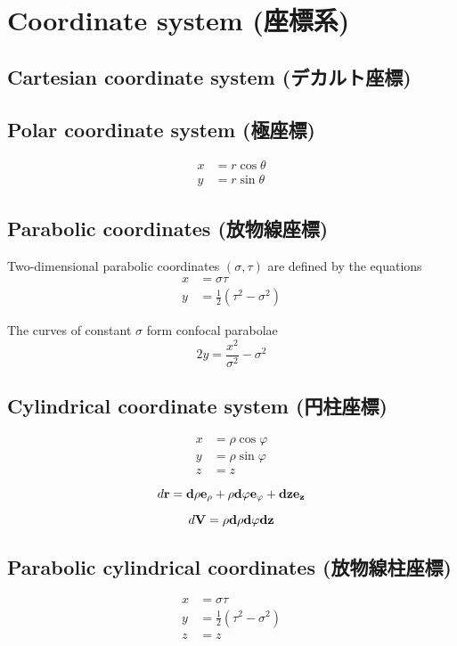 %
%
%
%
%
\section{Coordinate system (座標系)}


\subsection{Cartesian coordinate system (デカルト座標)}


\subsection{Polar coordinate system (極座標)}
\begin{align}
  x & = r\cos \theta \\
  y & = r\sin \theta
\end{align}


\subsection{Parabolic coordinates (放物線座標)}
Two-dimensional parabolic coordinates $ (\sigma ,\tau ) $ are defined by the equations
\begin{align}
  x & = \sigma \tau \\
  y & = \frac{1}{2} \left( \tau^{2} - \sigma^{2} \right)
\end{align}

The curves of constant $ \sigma  $ form confocal parabolae
\begin{equation}
  2y = \frac{x^{2}}{\sigma^{2}} - \sigma^{2}
\end{equation}



\subsection{Cylindrical coordinate system (円柱座標)}
\begin{align}
  x & = \rho \cos \varphi  \\
  y & = \rho \sin \varphi \\
  z & = z
\end{align}

\begin{equation}
  d \bf{r} = d \rho \bf{e_{\rho}} + \rho d \varphi \bf{e_{\varphi}} + dz \bf{e_{z}}
\end{equation}

\begin{equation}
  d \bf{V} = \rho d \rho  d \varphi dz
\end{equation}



\subsection{Parabolic cylindrical coordinates (放物線柱座標)}
\begin{align}
  x & = \sigma \tau \\
  y & = \frac{1}{2} \left( \tau^{2} - \sigma^{2} \right) \\
  z & = z
\end{align}
